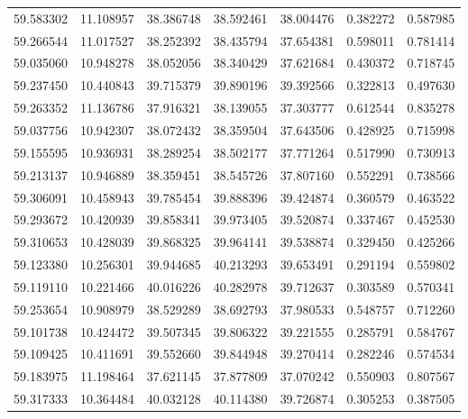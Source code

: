 \begin{tabular}{rrrrrrr}
 59.583302 &  11.108957 &         38.386748 &         38.592461 &         38.004476 &  0.382272 &  0.587985 \\
 59.266544 &  11.017527 &         38.252392 &         38.435794 &         37.654381 &  0.598011 &  0.781414 \\
 59.035060 &  10.948278 &         38.052056 &         38.340429 &         37.621684 &  0.430372 &  0.718745 \\
 59.237450 &  10.440843 &         39.715379 &         39.890196 &         39.392566 &  0.322813 &  0.497630 \\
 59.263352 &  11.136786 &         37.916321 &         38.139055 &         37.303777 &  0.612544 &  0.835278 \\
 59.037756 &  10.942307 &         38.072432 &         38.359504 &         37.643506 &  0.428925 &  0.715998 \\
 59.155595 &  10.936931 &         38.289254 &         38.502177 &         37.771264 &  0.517990 &  0.730913 \\
 59.213137 &  10.946889 &         38.359451 &         38.545726 &         37.807160 &  0.552291 &  0.738566 \\
 59.306091 &  10.458943 &         39.785454 &         39.888396 &         39.424874 &  0.360579 &  0.463522 \\
 59.293672 &  10.420939 &         39.858341 &         39.973405 &         39.520874 &  0.337467 &  0.452530 \\
 59.310653 &  10.428039 &         39.868325 &         39.964141 &         39.538874 &  0.329450 &  0.425266 \\
 59.123380 &  10.256301 &         39.944685 &         40.213293 &         39.653491 &  0.291194 &  0.559802 \\
 59.119110 &  10.221466 &         40.016226 &         40.282978 &         39.712637 &  0.303589 &  0.570341 \\
 59.253654 &  10.908979 &         38.529289 &         38.692793 &         37.980533 &  0.548757 &  0.712260 \\
 59.101738 &  10.424472 &         39.507345 &         39.806322 &         39.221555 &  0.285791 &  0.584767 \\
 59.109425 &  10.411691 &         39.552660 &         39.844948 &         39.270414 &  0.282246 &  0.574534 \\
 59.183975 &  11.198464 &         37.621145 &         37.877809 &         37.070242 &  0.550903 &  0.807567 \\
 59.317333 &  10.364484 &         40.032128 &         40.114380 &         39.726874 &  0.305253 &  0.387505 \\

\end{tabular}
